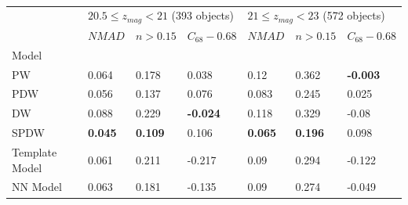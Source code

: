 \documentclass[fleqn,usenatbib]{mnras}
\begin{document}
\begin{table}
	\begin{tabular}{lllllll}
            \hline
            {} & \multicolumn{3}{l}{$20.5 \leq z_{mag} < 21$ (393 objects)} & \multicolumn{3}{l}{$21 \leq z_{mag} < 23$ (572 objects)} \\
            {} &                                 $NMAD$ &        $n>0.15$ &  $C_{68} - 0.68$ &                               $NMAD$ &        $n>0.15$ &  $C_{68} - 0.68$ \\
            Model          &                                        &                 &                  &                                      &                 &                  \\
            \hline
            PW             &                                  0.064 &           0.178 &            0.038 &                                 0.12 &           0.362 &  \textbf{-0.003} \\
            PDW            &                                  0.056 &           0.137 &            0.076 &                                0.083 &           0.245 &            0.025 \\
            DW             &                                  0.088 &           0.229 &  \textbf{-0.024} &                                0.118 &           0.329 &            -0.08 \\
            SPDW           &                         \textbf{0.045} &  \textbf{0.109} &            0.106 &                       \textbf{0.065} &  \textbf{0.196} &            0.098 \\
            Template Model &                                  0.061 &           0.211 &           -0.217 &                                 0.09 &           0.294 &           -0.122 \\
            NN Model       &                                  0.063 &           0.181 &           -0.135 &                                 0.09 &           0.274 &           -0.049 \\
            \hline
            \end{tabular}
            \caption{}
\end{table}
\end{document}
